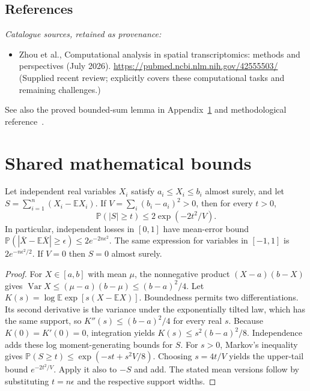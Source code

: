 \documentclass[11pt]{article}
\begin{document}
\subsection{References}
\noindent\emph{Catalogue sources, retained as provenance:}
\begin{itemize}
\item Zhou et al., Computational analysis in spatial transcriptomics: methods and perspectives (July 2026). \url{https://pubmed.ncbi.nlm.nih.gov/42555503/} (Supplied recent review; explicitly covers these computational tasks and remaining challenges.)
\end{itemize}
\noindent See also the proved bounded-sum lemma in Appendix~\ref{app:bounds} and methodological reference~\cite{hoeffding}.




\section{Shared mathematical bounds}\label{app:bounds}
\begin{lemma}\label{lem:bounded}
Let independent real variables $X_i$ satisfy $a_i\leq X_i\leq b_i$ almost surely,
and let $S=\sum_{i=1}^n(X_i-\mathbb{E} X_i)$. If
$V=\sum_i(b_i-a_i)^2>0$, then for every $t>0$,
\[
 \mathbb{P}(|S|\geq t)\leq 2\exp(-2t^2/V).
\]
In particular, independent losses in $[0,1]$ have mean-error bound
$\mathbb{P}(|\overline X-\mathbb{E}\overline X|\geq\epsilon)
\leq2e^{-2n\epsilon^2}$. The same expression for variables in $[-1,1]$
is $2e^{-n\epsilon^2/2}$. If $V=0$ then $S=0$ almost surely.
\end{lemma}
\begin{proof}
For $X\in[a,b]$ with mean $\mu$, the nonnegative product
$(X-a)(b-X)$ gives
$\operatorname{Var} X\leq(\mu-a)(b-\mu)\leq(b-a)^2/4$.
Let $K(s)=\log\mathbb{E}\exp[s(X-\mathbb{E} X)]$.
Boundedness permits two differentiations. Its second derivative is the variance
under the exponentially tilted law, which has the same support, so
$K''(s)\leq(b-a)^2/4$ for every real $s$.
Because $K(0)=K'(0)=0$, integration yields
$K(s)\leq s^2(b-a)^2/8$.
Independence adds these log moment-generating bounds for $S$.
For $s>0$, Markov's inequality gives
$\mathbb{P}(S\geq t)\leq\exp(-st+s^2V/8)$.
Choosing $s=4t/V$ yields the upper-tail bound $e^{-2t^2/V}$.
Apply it also to $-S$ and add. The stated mean versions follow by substituting
$t=n\epsilon$ and the respective support widths.
\end{proof}
\end{document}
